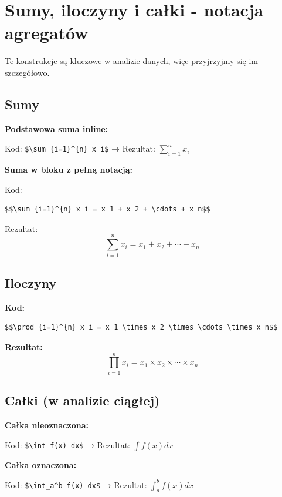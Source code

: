 \documentclass[
  polish,
  letterpaper,
  DIV=11,
  numbers=noendperiod]{scrreprt}
\begin{document}
\section{Sumy, iloczyny i całki - notacja
agregatów}\label{sumy-iloczyny-i-caux142ki---notacja-agregatuxf3w}

Te konstrukcje są kluczowe w analizie danych, więc przyjrzyjmy się im
szczegółowo.

\subsection{Sumy}\label{sumy}

\textbf{Podstawowa suma inline:}

Kod: \texttt{\$\textbackslash{}sum\_\{i=1\}\^{}\{n\}\ x\_i\$} →
Rezultat: \(\sum_{i=1}^{n} x_i\)

\textbf{Suma w bloku z pełną notacją:}

Kod:

\begin{verbatim}
$$\sum_{i=1}^{n} x_i = x_1 + x_2 + \cdots + x_n$$
\end{verbatim}

Rezultat: \[\sum_{i=1}^{n} x_i = x_1 + x_2 + \cdots + x_n\]

\subsection{Iloczyny}\label{iloczyny}

\textbf{Kod:}

\begin{verbatim}
$$\prod_{i=1}^{n} x_i = x_1 \times x_2 \times \cdots \times x_n$$
\end{verbatim}

\textbf{Rezultat:}
\[\prod_{i=1}^{n} x_i = x_1 \times x_2 \times \cdots \times x_n\]

\subsection{Całki (w analizie
ciągłej)}\label{caux142ki-w-analizie-ciux105gux142ej}

\textbf{Całka nieoznaczona:}

Kod: \texttt{\$\textbackslash{}int\ f(x)\ dx\$} → Rezultat:
\(\int f(x) dx\)

\textbf{Całka oznaczona:}

Kod: \texttt{\$\textbackslash{}int\_a\^{}b\ f(x)\ dx\$} → Rezultat:
\(\int_a^b f(x) dx\)
\end{document}
